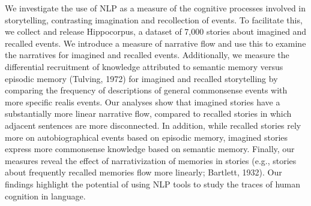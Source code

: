 We investigate the use of NLP as a measure of the cognitive processes involved in storytelling, contrasting imagination and recollection of events. To facilitate this, we collect and release Hippocorpus, a dataset of 7,000 stories about imagined and recalled events. We introduce a measure of narrative flow and use this to examine the narratives for imagined and recalled events. Additionally, we measure the differential recruitment of knowledge attributed to semantic memory versus episodic memory (Tulving, 1972) for imagined and recalled storytelling by comparing the frequency of descriptions of general commonsense events with more specific realis events. Our analyses show that imagined stories have a substantially more linear narrative flow, compared to recalled stories in which adjacent sentences are more disconnected. In addition, while recalled stories rely more on autobiographical events based on episodic memory, imagined stories express more commonsense knowledge based on semantic memory. Finally, our measures reveal the effect of narrativization of memories in stories (e.g., stories about frequently recalled memories flow more linearly; Bartlett, 1932). Our findings highlight the potential of using NLP tools to study the traces of human cognition in language.
